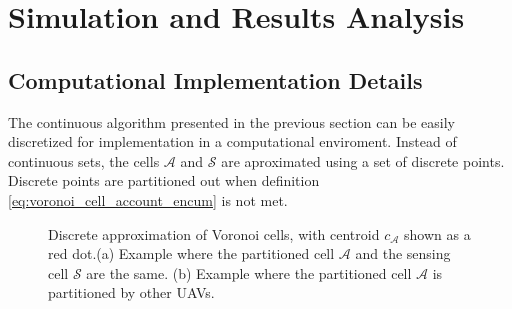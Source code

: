         

\section{Simulation and Results Analysis}

    \subsection{Computational Implementation Details}
        The continuous algorithm presented in the previous section can be easily discretized for implementation in a computational enviroment.
        Instead of continuous sets, the cells $\mathcal{A}$ and $\mathcal{S}$ are aproximated using a set of discrete points.   
        Discrete points are partitioned out when definition \eqref{eq:voronoi_cell_account_encum} is not met.
        \begin{figure}[H]
            \centering
            \caption{
                Discrete approximation of Voronoi cells, with centroid $c_{\mathcal{A}}$ shown as a red dot.(a) Example where the partitioned cell $\mathcal{A}$ and the sensing cell $\mathcal{S}$ are the same. (b) Example where the partitioned cell $\mathcal{A}$ is partitioned by other \ac{UAV}s.
            }
            \label{fig:rviz_cells}
        \end{figure}
        

